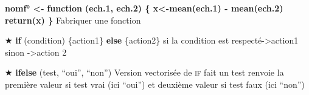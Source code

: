 \documentclass[11, a4paper, landscape]{article}
\newif\ifadvanced
\newcommand{\grasindex}[1]{\textbf{#1} \index{#1\textbf}}
\newcommand{\bu}[0]{\ifadvanced \else \hspace*{-1mm}$\bigstar$ \hspace*{0.15mm}\fi}
\newcommand{\adv}[1]{\ifadvanced #1 \fi}
\begin{document}
\begin{multicols*}{3}
\adv{
  Les arguments de fonction sont cherchés d'abord par un match exacte du nom, puis par un match partiel et enfin par la position.
  \\
}

\textbf{nomf° \textless{}-} \grasindex{function}\textbf{(ech.1, ech.2) \{ x\textless{}-mean(ech.1) - mean(ech.2) return(x) \}}  \quad Fabriquer une fonction

\bu\grasindex{if}(condition)  \{action1\}   \grasindex{else}  \{action2\}  \quad si la condition est respecté-\textgreater{}action1 sinon -\textgreater{}action 2

\bu\grasindex{ifelse}(test, ``oui'', ``non'')  \quad Version vectorisée de \textsc{if} fait un test renvoie la première valeur si test vrai (ici ``oui'') et deuxième valeur si test faux (ici ``non'')

\adv{
  \grasindex{while}(condition) \{commandes\}  \quad boucle la commande tant que la condition est vrai

  \grasindex{repeat} \textbf{\{commandes\}}   \quad boucle infinie

  \grasindex{body}(f) \quad donne le corps de la fonction f

  \grasindex{formals}(f) \quad donne les arguments de la fonction f

  \grasindex{environment}(f) \quad donne l'environnement de la fonction f

  \grasindex{do.call}(f, listargs) \quad Applique la fonction f avec les arguments listés dans listargs
}

\adv{
  \subsection{Modèle nul}

  \grasindex{permatswap}(a, times =100)  \quad création de 100 matrices aléatoires. Pour contrôler les sommes des lignes et/ou des colonnes: fixedmar=("none", "rows", "columns", "both"). Attention il existe plusieurs méthodes de randomisation (swap, quasiswap, tswap) \textit{cf} ?permat ; package \grasindex{Vegan}

  \grasindex{sample}(X, size = y, prob=Y)  \quad tirage de y éléments dans le vecteur X selon le vecteur de probabilité Y
}

\adv{
  \subsection{Autres fonctions pour la programmation}

}
\end{multicols*}
\end{document}

